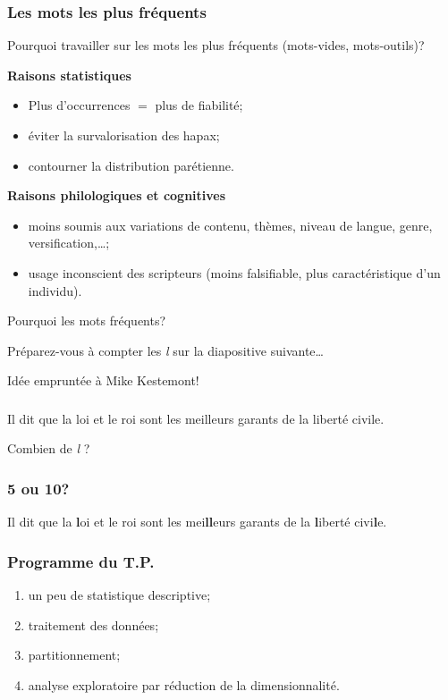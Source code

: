 \documentclass{beamer}
\begin{document}
\begin{frame}
\frametitle{Les mots les plus fréquents}
Pourquoi travailler sur les mots les plus fréquents (mots-vides, mots-outils)?

\textbf{Raisons statistiques}
\begin{itemize}
\item Plus d'occurrences $=$ plus de fiabilité;
\item éviter la survalorisation des hapax;
\item contourner la distribution parétienne.
\end{itemize}

\textbf{Raisons philologiques et cognitives}
\begin{itemize}
\item moins soumis aux variations de contenu, thèmes, niveau de langue, genre, versification,\dots;
\item usage inconscient des scripteurs (moins falsifiable, plus caractéristique d'un individu).
\end{itemize}

\end{frame}


\begin{frame}{Pourquoi les mots fréquents?}

\huge

Préparez-vous à compter les \textit{l} sur la diapositive suivante…


{\normalsize Idée empruntée à Mike Kestemont!}

\end{frame}


\begin{frame}
\frametitle{}


\huge

Il dit que la loi et le roi sont les meilleurs garants de la liberté civile.

\end{frame}

\begin{frame}{Combien de \textit{l} ?}


\end{frame}


\begin{frame}
\frametitle{5 ou 10?}

\huge

I\alert{l} dit que \alert{l}a \textbf{l}oi et \alert{l}e roi sont \alert{l}es mei\textbf{ll}eurs garants de \alert{l}a \textbf{l}iberté civi\textbf{l}e.

\end{frame}


\begin{frame}
\frametitle{Programme du T.P.}
	
	\begin{enumerate}
		\item un peu de statistique descriptive;
		\item traitement des données;
		\item partitionnement;
		\item analyse exploratoire par réduction de la dimensionnalité.
	\end{enumerate}
	
\end{frame}
\end{document}
